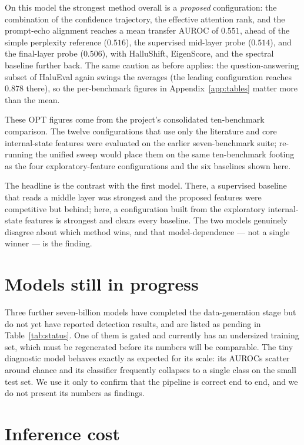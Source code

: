 On this model the strongest method overall is a \emph{proposed} configuration: the
combination of the confidence trajectory, the effective attention rank, and the prompt-echo
alignment reaches a mean transfer AUROC of $0.551$, ahead of the simple perplexity reference
($0.516$), the supervised mid-layer probe ($0.514$), and the final-layer probe ($0.506$),
with HalluShift, EigenScore, and the spectral baseline further back. The same caution as
before applies: the question-answering subset of HaluEval again swings the averages (the
leading configuration reaches $0.878$ there), so the per-benchmark figures in
Appendix~\ref{app:tables} matter more than the mean.

These OPT figures come from the project's consolidated ten-benchmark comparison. The twelve
configurations that use only the literature and core internal-state features were evaluated
on the earlier seven-benchmark suite; re-running the unified sweep would place them on the
same ten-benchmark footing as the four exploratory-feature configurations and the six
baselines shown here.

The headline is the contrast with the first model. There, a supervised baseline that reads a
middle layer was strongest and the proposed features were competitive but behind; here, a
configuration built from the exploratory internal-state features is strongest and clears
every baseline. The two models genuinely disagree about which method wins, and that
model-dependence --- not a single winner --- is the finding.

\section{Models still in progress}

Three further seven-billion models have completed the data-generation stage but do not yet
have reported detection results, and are listed as pending in Table~\ref{tab:status}. One
of them is gated and currently has an undersized training set, which must be regenerated
before its numbers will be comparable. The tiny diagnostic model behaves exactly as
expected for its scale: its AUROCs scatter around chance and its classifier frequently
collapses to a single class on the small test set. We use it only to confirm that the
pipeline is correct end to end, and we do not present its numbers as findings.

\section{Inference cost}
\label{sec:cost}

